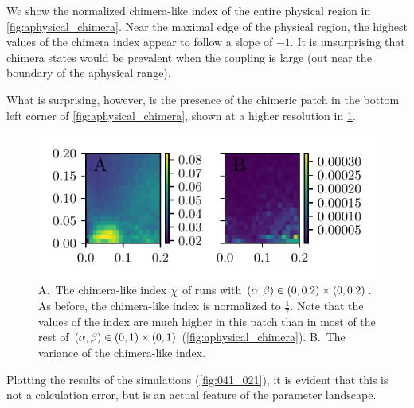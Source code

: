 We show the normalized chimera-like index of the entire physical region in \cref{fig:aphysical_chimera}.
Near the maximal edge of the physical region, the highest values of the chimera index appear to follow a slope of $-1$.
It is unsurprising that chimera states would be prevalent when the coupling is large (out near the boundary of the aphysical range).

What is surprising, however, is the presence of the chimeric patch in the bottom left corner of \cref{fig:aphysical_chimera}, shown at a higher resolution in \cref{fig:zoom}.
\begin{figure}[ht]
  \centering
  \includegraphics[width=\columnwidth]{figure/zoom_100dpi.pdf}
  \caption[Zoomed landscape]{A.\ The chimera-like index $\chi$ of runs with $(\alpha, \beta) \in (0, 0.2) \times (0, 0.2)$.
    As before, the chimera-like index is normalized to $\frac{1}{7}$.
    Note that the values of the index are much higher in this patch than in most of the rest of $(\alpha, \beta) \in (0, 1) \times (0, 1)$ (\cref{fig:aphysical_chimera}).
    B.\ The variance of the chimera-like index.
  }
  \label{fig:zoom}
\end{figure}
Plotting the results of the simulations (\cref{fig:041_021}),
it is evident that this is not a calculation error, but is an actual feature of the parameter landscape.
